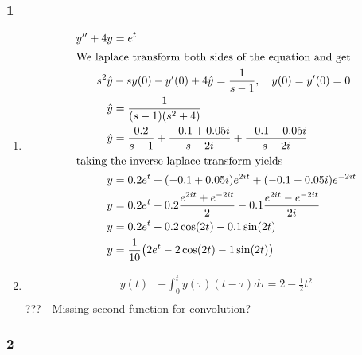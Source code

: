 \documentclass[a4paper]{article}
\newcommand{\ex}[1]{\subsubsection*{#1}}
\begin{document}
\pagestyle{fancy} %

\fancyfoot{}

\ex{1}

\begin{enumerate}[label=\alph*)]
    \item
        \begin{align}
            y'' + 4y &= e^t \\
            \intertext{We laplace transform both sides of the equation and get}
            s^2\hat y &- sy(0) - y'(0) + 4 \hat y = \frac{1}{s-1}, \quad y(0) = y'(0) = 0\\
            \hat y &= \frac{1}{(s-1)(s^2 + 4)}\\
            \hat y &= \frac{0.2}{s-1} + \frac{-0.1 + 0.05i}{s-2i} + \frac{-0.1
                - 0.05i}{s+2i} \\
            \intertext{taking the inverse laplace transform yields}
            y &= 0.2e^t + ( -0.1 + 0.05i)e^{2it} + ( -0.1 - 0.05i)e^{-2it} \\
            y &= 0.2e^t -0.2\frac{e^{2it}+e^{-2it}}{2} - 0.1\frac{e^{2it} -
                e^{-2it}}{2i} \\
            y &= 0.2e^t - 0.2\cos(2t) - 0.1\sin(2t) \\
            y &= \frac{1}{10}\big(2e^t - 2\cos(2t) - 1\sin(2t)\big) \\
        \end{align}

    \item
        \begin{align}
            y(t) &- \int_0^t{y(\tau)(t-\tau) d\tau} = 2 - \frac{1}{2}t^2 \\
        \end{align}
        ??? - Missing second function for convolution?
\end{enumerate}


\newpage
\ex{2}
\end{document}
